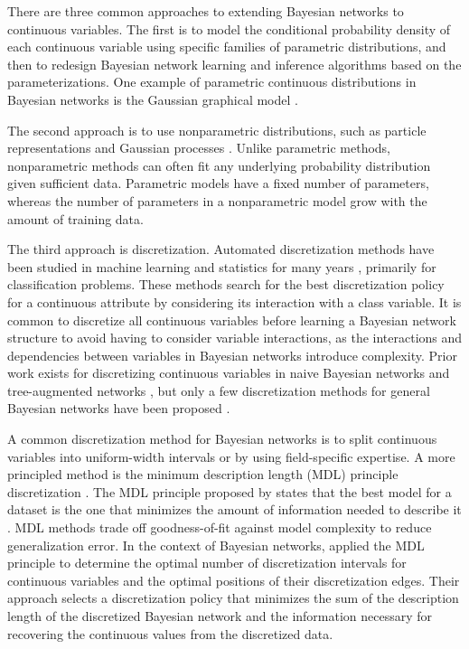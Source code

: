 There are three common approaches to extending Bayesian networks to continuous variables.
The first is to model the conditional probability density of each continuous variable using specific families of parametric distributions, and then to redesign Bayesian network learning and inference algorithms based on the parameterizations.
One example of parametric continuous distributions in Bayesian networks is the Gaussian graphical model \citep{Weiss_2011}.

The second approach is to use nonparametric distributions, such as particle representations and Gaussian processes \citep{Ickstadt_2010}.
Unlike parametric methods, nonparametric methods can often fit any underlying probability distribution given sufficient data.
Parametric models have a fixed number of parameters, whereas the number of parameters in a nonparametric model grow with the amount of training data.

The third approach is discretization.
Automated discretization methods have been studied in machine learning and statistics for many years \citep{Dougherty_1995, Kerber_1992, Holte_1993, Fayyad_1993}, primarily for classification problems.
These methods search for the best discretization policy for a continuous attribute by considering its interaction with a class variable.
It is common to discretize all continuous variables before learning a Bayesian network structure to avoid having to consider variable interactions, as the interactions and dependencies between variables in Bayesian networks introduce complexity.
Prior work exists for discretizing continuous variables in naive Bayesian networks and tree-augmented networks \citep{Fried_naive}, but only a few discretization methods for general Bayesian networks have been proposed \citep{Friedman_1996, Kozlov_1997, Monti_1998, Steck_2007}.


A common discretization method for Bayesian networks is to split continuous variables into uniform-width intervals or by using field-specific expertise.
A more principled method is the minimum description length (MDL) principle discretization \citep{Friedman_1996}.
The MDL principle proposed by \cite{MDL_1978} states that the best model for a dataset is the one that minimizes the amount of information needed to describe it \citep{Grunwald_2009}.
MDL methods trade off goodness-of-fit against model complexity to reduce generalization error.
In the context of Bayesian networks, \cite{Friedman_1996} applied the MDL principle to determine the optimal number of discretization intervals for continuous variables and the optimal positions of their discretization edges.
Their approach selects a discretization policy that minimizes the sum of the description length of the discretized Bayesian network and the information necessary for recovering the continuous values from the discretized data.

